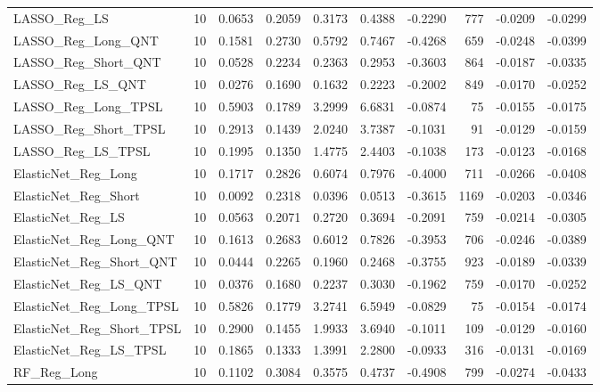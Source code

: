 \begin{tabular}{llrrrrrrrr}
\cline{1-10}
LASSO\_Reg\_LS & 10 & 0.0653 & 0.2059 & 0.3173 & 0.4388 & -0.2290 & 777 & -0.0209 & -0.0299 \\
\cline{1-10}
LASSO\_Reg\_Long\_QNT & 10 & 0.1581 & 0.2730 & 0.5792 & 0.7467 & -0.4268 & 659 & -0.0248 & -0.0399 \\
\cline{1-10}
LASSO\_Reg\_Short\_QNT & 10 & 0.0528 & 0.2234 & 0.2363 & 0.2953 & -0.3603 & 864 & -0.0187 & -0.0335 \\
\cline{1-10}
LASSO\_Reg\_LS\_QNT & 10 & 0.0276 & 0.1690 & 0.1632 & 0.2223 & -0.2002 & 849 & -0.0170 & -0.0252 \\
\cline{1-10}
LASSO\_Reg\_Long\_TPSL & 10 & 0.5903 & 0.1789 & 3.2999 & 6.6831 & -0.0874 & 75 & -0.0155 & -0.0175 \\
\cline{1-10}
LASSO\_Reg\_Short\_TPSL & 10 & 0.2913 & 0.1439 & 2.0240 & 3.7387 & -0.1031 & 91 & -0.0129 & -0.0159 \\
\cline{1-10}
LASSO\_Reg\_LS\_TPSL & 10 & 0.1995 & 0.1350 & 1.4775 & 2.4403 & -0.1038 & 173 & -0.0123 & -0.0168 \\
\cline{1-10}
ElasticNet\_Reg\_Long & 10 & 0.1717 & 0.2826 & 0.6074 & 0.7976 & -0.4000 & 711 & -0.0266 & -0.0408 \\
\cline{1-10}
ElasticNet\_Reg\_Short & 10 & 0.0092 & 0.2318 & 0.0396 & 0.0513 & -0.3615 & 1169 & -0.0203 & -0.0346 \\
\cline{1-10}
ElasticNet\_Reg\_LS & 10 & 0.0563 & 0.2071 & 0.2720 & 0.3694 & -0.2091 & 759 & -0.0214 & -0.0305 \\
\cline{1-10}
ElasticNet\_Reg\_Long\_QNT & 10 & 0.1613 & 0.2683 & 0.6012 & 0.7826 & -0.3953 & 706 & -0.0246 & -0.0389 \\
\cline{1-10}
ElasticNet\_Reg\_Short\_QNT & 10 & 0.0444 & 0.2265 & 0.1960 & 0.2468 & -0.3755 & 923 & -0.0189 & -0.0339 \\
\cline{1-10}
ElasticNet\_Reg\_LS\_QNT & 10 & 0.0376 & 0.1680 & 0.2237 & 0.3030 & -0.1962 & 759 & -0.0170 & -0.0252 \\
\cline{1-10}
ElasticNet\_Reg\_Long\_TPSL & 10 & 0.5826 & 0.1779 & 3.2741 & 6.5949 & -0.0829 & 75 & -0.0154 & -0.0174 \\
\cline{1-10}
ElasticNet\_Reg\_Short\_TPSL & 10 & 0.2900 & 0.1455 & 1.9933 & 3.6940 & -0.1011 & 109 & -0.0129 & -0.0160 \\
\cline{1-10}
ElasticNet\_Reg\_LS\_TPSL & 10 & 0.1865 & 0.1333 & 1.3991 & 2.2800 & -0.0933 & 316 & -0.0131 & -0.0169 \\
\cline{1-10}
RF\_Reg\_Long & 10 & 0.1102 & 0.3084 & 0.3575 & 0.4737 & -0.4908 & 799 & -0.0274 & -0.0433 \\

\end{tabular}
